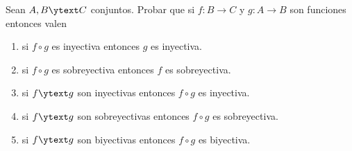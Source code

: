 \begin{enunciado}{\ejercicio}
  Sean $A, B \ytext C$ conjuntos. Probar que si $f: B \to C$ y $g: A \to B$ son funciones entonces valen
  \begin{enumerate}[label=\roman*), itemsep = -5pt]
    \item si $f \circ g$ es inyectiva entonces $g$ es inyectiva.
    \item si $f \circ g$ es sobreyectiva entonces $f$ es sobreyectiva.
    \item si $f \ytext g$ son inyectivas entonces $f \circ g$ es inyectiva.
    \item si $f \ytext g$ son sobreyectivas entonces $f \circ g$ es sobreyectiva.
    \item si $f \ytext g$ son biyectivas entonces $f \circ g$ es biyectiva.
  \end{enumerate}
\end{enunciado}

\hacer
